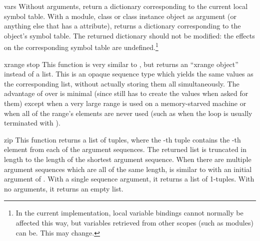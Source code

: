 \begin{funcdesc}{vars}{}
  Without arguments, return a dictionary corresponding to the current
  local symbol table.  With a module, class or class instance object
  as argument (or anything else that has a 
  attribute), returns a dictionary corresponding to the object's
  symbol table.  The returned dictionary should not be modified: the
  effects on the corresponding symbol table are undefined.\footnote{
    In the current implementation, local variable bindings cannot
    normally be affected this way, but variables retrieved from
    other scopes (such as modules) can be.  This may change.}
\end{funcdesc}

\begin{funcdesc}{xrange}{ stop}
  This function is very similar to , but returns an
  ``xrange object'' instead of a list.  This is an opaque sequence
  type which yields the same values as the corresponding list, without
  actually storing them all simultaneously.  The advantage of
   over  is minimal (since
   still has to create the values when asked for
  them) except when a very large range is used on a memory-starved
  machine or when all of the range's elements are never used (such as
  when the loop is usually terminated with ).

\end{funcdesc}

\begin{funcdesc}{zip}{}
  This function returns a list of tuples, where the -th tuple contains
  the -th element from each of the argument sequences.
  The returned list is truncated in length to the length of
  the shortest argument sequence.  When there are multiple argument
  sequences which are all of the same length,  is
  similar to  with an initial argument of .
  With a single sequence argument, it returns a list of 1-tuples.
  With no arguments, it returns an empty list.

\end{funcdesc}


